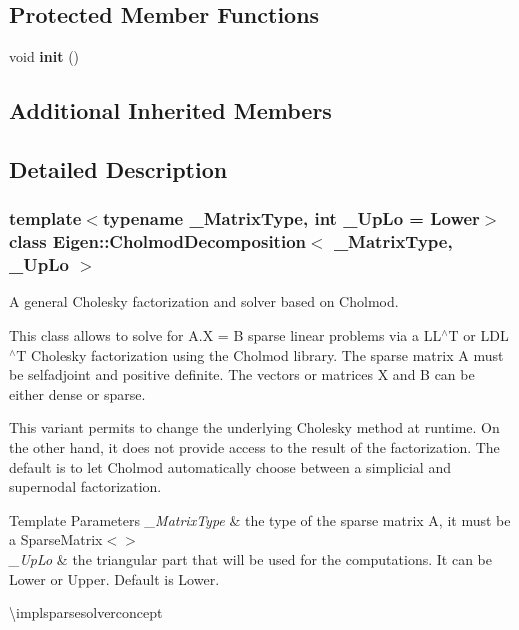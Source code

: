 \subsection*{Protected Member Functions}
\begin{DoxyCompactItemize}
\item 
\mbox{\label{class_eigen_1_1_cholmod_decomposition_a85db020782a18263b54252eb7b4ba15f}} 
void {\bfseries init} ()
\end{DoxyCompactItemize}
\subsection*{Additional Inherited Members}


\subsection{Detailed Description}
\subsubsection*{template$<$typename \+\_\+\+Matrix\+Type, int \+\_\+\+Up\+Lo = Lower$>$\newline
class Eigen\+::\+Cholmod\+Decomposition$<$ \+\_\+\+Matrix\+Type, \+\_\+\+Up\+Lo $>$}

A general Cholesky factorization and solver based on Cholmod. 

This class allows to solve for A.\+X = B sparse linear problems via a L\+L$^\wedge$T or L\+D\+L$^\wedge$T Cholesky factorization using the Cholmod library. The sparse matrix A must be selfadjoint and positive definite. The vectors or matrices X and B can be either dense or sparse.

This variant permits to change the underlying Cholesky method at runtime. On the other hand, it does not provide access to the result of the factorization. The default is to let Cholmod automatically choose between a simplicial and supernodal factorization.


\begin{DoxyTemplParams}{Template Parameters}
{\em \+\_\+\+Matrix\+Type} & the type of the sparse matrix A, it must be a Sparse\+Matrix$<$$>$ \\
\hline
{\em \+\_\+\+Up\+Lo} & the triangular part that will be used for the computations. It can be Lower or Upper. Default is Lower.\\
\hline
\end{DoxyTemplParams}
\textbackslash{}implsparsesolverconcept

